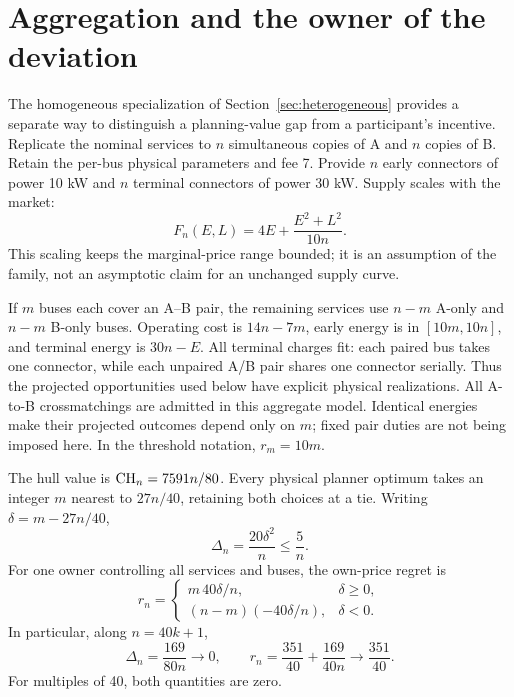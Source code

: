 \section{Aggregation and the owner of the deviation}\label{sec:ownership}
The homogeneous specialization of Section~\ref{sec:heterogeneous} provides
a separate way to distinguish a planning-value gap from a participant's
incentive. Replicate the nominal services to $n$
simultaneous copies of A and $n$ copies of B. Retain the per-bus physical
parameters and fee 7. Provide $n$ early connectors of power 10 kW and $n$
terminal connectors of power 30 kW. Supply scales with the market:
\begin{equation}\label{eq:scaledF}
 F_n(E,L)=4E+\frac{E^2+L^2}{10n}.
\end{equation}
This scaling keeps the marginal-price range bounded; it is an assumption
of the family, not an asymptotic claim for an unchanged supply curve.

If $m$ buses each cover an A--B pair, the remaining services use $n-m$
A-only and $n-m$ B-only buses. Operating cost is $14n-7m$, early energy
is in $[10m,10n]$, and terminal energy is $30n-E$. All terminal charges
fit: each paired bus takes one connector, while each unpaired A/B pair
shares one connector serially. Thus the projected opportunities used below
have explicit physical realizations.
All A-to-B crossmatchings are admitted in this aggregate model. Identical
energies make their projected outcomes depend only on $m$; fixed pair duties
are not being imposed here. In the threshold notation, $r_m=10m$.

\begin{theorem}\label{thm:replication}
The hull value is $\mathrm{CH}_n=7591n/80$. Every physical planner optimum takes
an integer $m$ nearest to $27n/40$, retaining both choices at a tie.
Writing $\delta=m-27n/40$,
\begin{equation}\label{eq:scaledgap}
 \Delta_n=\frac{20\delta^2}{n}\le\frac5n.
\end{equation}
For one owner controlling all services and buses, the own-price regret is
\begin{equation}\label{eq:scaledregret}
 r_n=
 \begin{cases}
 m\,40\delta/n,&\delta\ge0,\\
 (n-m)(-40\delta/n),&\delta<0.
 \end{cases}
\end{equation}
In particular, along $n=40k+1$,
\[
 \Delta_n=\frac{169}{80n}\longrightarrow0,\qquad
 r_n=\frac{351}{40}+\frac{169}{40n}
 \longrightarrow\frac{351}{40}.
\]
For multiples of 40, both quantities are zero.
\end{theorem}

